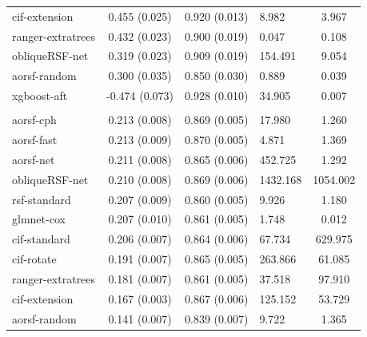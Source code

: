 \documentclass[twoside,11pt]{article}\usepackage[]{graphicx}\usepackage[]{xcolor}
\newenvironment{knitrout}{}{} %
\begin{document}
\begin{knitrout}
\begin{longtable}[t]{lcclc}
\hspace{1em}cif-extension & 0.455 (0.025) & 0.920 (0.013) & 8.982 & 3.967\\
\hspace{1em}ranger-extratrees & 0.432 (0.023) & 0.900 (0.019) & 0.047 & 0.108\\
\hspace{1em}obliqueRSF-net & 0.319 (0.023) & 0.909 (0.019) & 154.491 & 9.054\\
\hspace{1em}aorsf-random & 0.300 (0.035) & 0.850 (0.030) & 0.889 & 0.039\\
\hspace{1em}xgboost-aft & -0.474 (0.073) & 0.928 (0.010) & 34.905 & 0.007\\
\addlinespace[0.3em]
\hline
\multicolumn{5}{l}{\textit{\textbf{Non-alcohol fatty liver disease; death, n = 17549, p = 24}}}\\
\hline
\hspace{1em}aorsf-cph & 0.213 (0.008) & 0.869 (0.005) & 17.980 & 1.260\\
\hspace{1em}aorsf-fast & 0.213 (0.009) & 0.870 (0.005) & 4.871 & 1.369\\
\hspace{1em}aorsf-net & 0.211 (0.008) & 0.865 (0.006) & 452.725 & 1.292\\
\hspace{1em}obliqueRSF-net & 0.210 (0.008) & 0.869 (0.006) & 1432.168 & 1054.002\\
\hspace{1em}rsf-standard & 0.207 (0.009) & 0.860 (0.005) & 9.926 & 1.180\\
\hspace{1em}glmnet-cox & 0.207 (0.010) & 0.861 (0.005) & 1.748 & 0.012\\
\hspace{1em}cif-standard & 0.206 (0.007) & 0.864 (0.006) & 67.734 & 629.975\\
\hspace{1em}cif-rotate & 0.191 (0.007) & 0.865 (0.005) & 263.866 & 61.085\\
\hspace{1em}ranger-extratrees & 0.181 (0.007) & 0.861 (0.005) & 37.518 & 97.910\\
\hspace{1em}cif-extension & 0.167 (0.003) & 0.867 (0.006) & 125.152 & 53.729\\
\hspace{1em}aorsf-random & 0.141 (0.007) & 0.839 (0.007) & 9.722 & 1.365\\

\end{longtable}
\end{knitrout}
\end{document}
